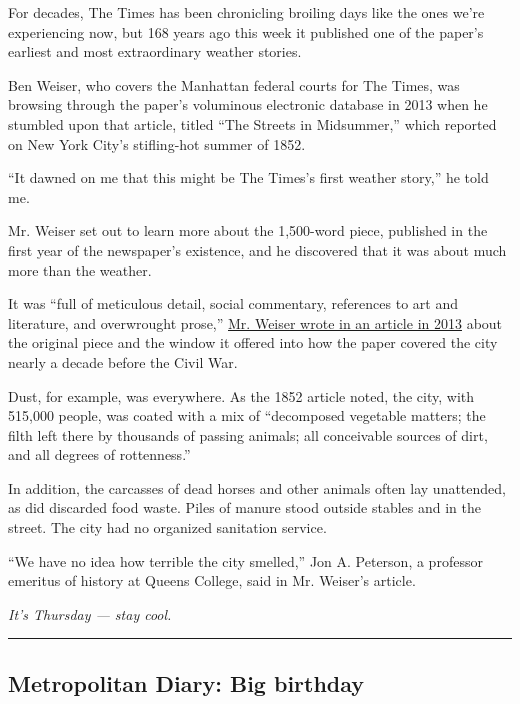 For decades, The Times has been chronicling broiling days like the ones
we're experiencing now, but 168 years ago this week it published one of
the paper's earliest and most extraordinary weather stories.

Ben Weiser, who covers the Manhattan federal courts for The Times, was
browsing through the paper's voluminous electronic database in 2013 when
he stumbled upon that article, titled ``The Streets in Midsummer,''
which reported on New York City's stifling-hot summer of 1852.

``It dawned on me that this might be The Times's first weather story,''
he told me.

Mr. Weiser set out to learn more about the 1,500-word piece, published
in the first year of the newspaper's existence, and he discovered that
it was about much more than the weather.

It was ``full of meticulous detail, social commentary, references to art
and literature, and overwrought prose,''
\href{https://archive.nytimes3xbfgragh.onion/www.nytimes3xbfgragh.onion/interactive/2013/07/28/nyregion/heat-struck-july-1852.html}{Mr.
Weiser wrote in an article in 2013} about the original piece and the
window it offered into how the paper covered the city nearly a decade
before the Civil War.

Dust, for example, was everywhere. As the 1852 article noted, the city,
with 515,000 people, was coated with a mix of ``decomposed vegetable
matters; the filth left there by thousands of passing animals; all
conceivable sources of dirt, and all degrees of rottenness.''

In addition, the carcasses of dead horses and other animals often lay
unattended, as did discarded food waste. Piles of manure stood outside
stables and in the street. The city had no organized sanitation service.

``We have no idea how terrible the city smelled,'' Jon A. Peterson, a
professor emeritus of history at Queens College, said in Mr. Weiser's
article.

\emph{It's Thursday --- stay cool.}

\begin{center}\rule{0.5\linewidth}{\linethickness}\end{center}

\hypertarget{metropolitan-diary-big-birthday}{%
\subsection{Metropolitan Diary: Big
birthday}\label{metropolitan-diary-big-birthday}}

